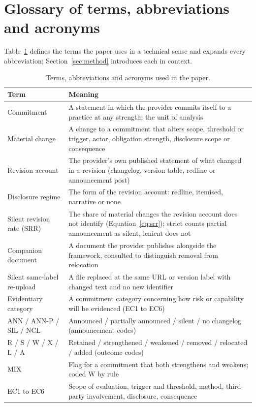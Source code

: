 \documentclass{article}
\newcommand{\srr}{\mathrm{SRR}}
\begin{document}
\section{Glossary of terms, abbreviations and acronyms}
\label{apx:glossary}
Table~\ref{tab:glossary} defines the terms the paper uses in a technical sense and expands every abbreviation; Section~\ref{sec:method} introduces each in context.
\begin{table}[H]\centering\small
\caption{Terms, abbreviations and acronyms used in the paper.}
\label{tab:glossary}
\begin{tabular}{lp{9.4cm}}
\toprule Term & Meaning \\ \midrule
Commitment & A statement in which the provider commits itself to a practice at any strength; the unit of analysis \\
Material change & A change to a commitment that alters scope, threshold or trigger, actor, obligation strength, disclosure scope or consequence \\
Revision account & The provider's own published statement of what changed in a revision (changelog, version table, redline or announcement post) \\
Disclosure regime & The form of the revision account: redline, itemised, narrative or none \\
Silent revision rate ($\srr$) & The share of material changes the revision account does not identify (Equation~\ref{eq:srr}); strict counts partial announcement as silent, lenient does not \\
Companion document & A document the provider publishes alongside the framework, consulted to distinguish removal from relocation \\
Silent same-label re-upload & A file replaced at the same URL or version label with changed text and no new identifier \\
Evidentiary category & A commitment category concerning how risk or capability will be evidenced (EC1 to EC6) \\
ANN / ANN-P / SIL / NCL & Announced / partially announced / silent / no changelog (announcement codes) \\
R / S / W / X / L / A & Retained / strengthened / weakened / removed / relocated / added (outcome codes) \\
MIX & Flag for a commitment that both strengthens and weakens; coded W by rule \\
EC1 to EC6 & Scope of evaluation, trigger and threshold, method, third-party involvement, disclosure, consequence \\

\end{tabular}
\end{table}
\end{document}
